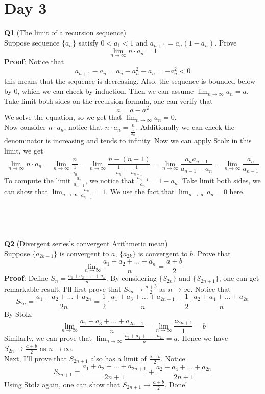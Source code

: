 \documentclass{article}
\begin{document}
\section{Day 3}
\textbf{Q1} (The limit of a recursion sequence)\\
Suppose sequence $\{a_n\}$ satisfy $0<a_1<1$ and $a_{n+1} = a_n (1-a_n)$. Prove
$$
\lim_{n \to \infty} n \cdot a_n = 1
$$
\textbf{Proof}: Notice that 
$$
a_{n+1} - a_n = a_n - a_n^2 - a_n = - a_n^2 <0
$$
this means that the sequence is decreasing. Also, the sequence is bounded below by 0, which we can check by induction.
Then we can assume $\lim_{n \to \infty} a_n = a$. Take limit both sides on the recursion formula, one can verify that 
$$
a = a - a^2
$$
We solve the equation, so we get that $\lim_{n \to \infty} a_n = 0$.\\
Now consider $n \cdot a_n$, notice that $n \cdot a_n = \frac{n}{\frac{1}{a_n}}$. Additionally we can check the denominator is increasing and tends to infinity. Now 
we can apply Stolz in this limit, we get
$$
\lim_{n \to \infty} n \cdot a_n = \lim_{n \to \infty}\frac{n}{\frac{1}{a_n}}=\lim_{n \to \infty} \frac{n-(n-1)}{\frac{1}{a_n}-\frac{1}{a_{n-1}}} = \lim_{n \to \infty} \frac{a_n a_{n-1}}{a_{n-1}-a_n} = \lim_{n \to \infty} \frac{a_n}{a_{n-1}}
$$
To compute the limit $\frac{a_n}{a_{n-1}}$, we notice that $\frac{a_{n+1}}{a_n} = 1 - a_n$. Take limit both sides, we can show that $\lim_{n \to \infty} \frac{a_n}{a_{n-1}} = 1$. We use the fact that $\lim_{n \to \infty} a_n = 0$ here.\\
\\
\\
\\
\\
\textbf{Q2} (Divergent series's convergent Arithmetic mean)\\
Suppose $\{a_{2k-1}\}$ is convergent to $a$, $\{a_{2k}\}$ is convergent to $b$. Prove that 
$$
\lim_{n \to \infty} \frac{a_1 + a_2 + \dots +a_n}{n} = \frac{a+b}{2}
$$
\textbf{Proof}: Define $S_n = \frac{a_1 + a_2 + \dots + a_n}{n}$. By considering $\{S_{2n}\}$ and $\{S_{2n+1}\}$, one can get remarkable result. I'll first prove that
$S_{2n} \rightarrow \frac{a+b}{2}$ as $n \rightarrow \infty$. Notice that 
$$
S_{2n} = \frac{a_1 + a_2 + \dots + a_{2n}}{2n} = \frac{1}{2} \cdot \frac{a_1 + a_3 + \dots + a_{2n-1}}{n} + \frac{1}{2} \cdot \frac{a_2 + a_4 + \dots + a_{2n}}{n}
$$
By Stolz, 
$$
\lim_{n \to \infty} \frac{a_1 + a_3 + \dots + a_{2n-1}}{n} = \lim_{n \to \infty} \frac{a_{2n+1}}{1} = b
$$
Similarly, we can prove that $\lim_{n \to \infty} \frac{a_2 + a_4 + \dots + a_{2n}}{n} = a$. Hence we have $S_{2n} \rightarrow \frac{a+b}{2}$ as $n \rightarrow \infty$.\\
Next, I'll prove that $S_{2n+1}$ also has a limit of $\frac{a+b}{2}$. Notice
$$
S_{2n+1} = \frac{a_1 + a_2 + \dots + a_{2n+1}}{2n+1} + \frac{a_2 + a_4 + \dots + a_{2n}}{2n+1}
$$
Using Stolz again, one can show that $S_{2n+1} \rightarrow \frac{a+b}{2}$. Done!\\
\\
\\
\\
\\
\end{document}
